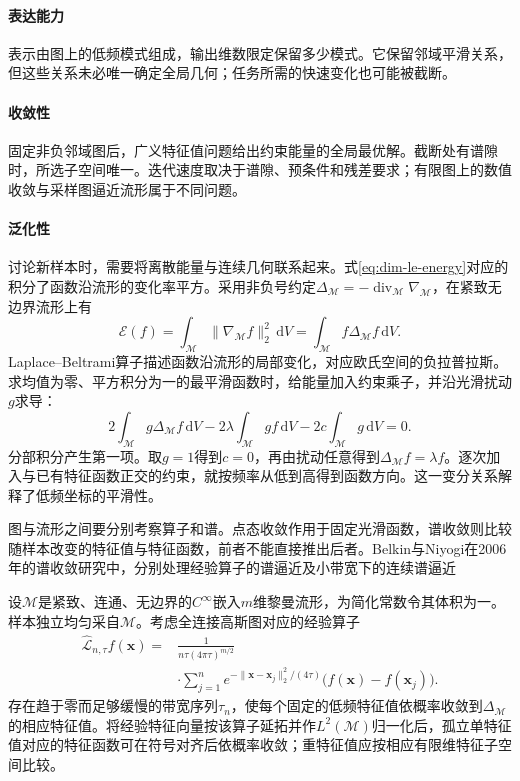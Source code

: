 \paragraph{表达能力}
表示由图上的低频模式组成，输出维数限定保留多少模式。它保留邻域平滑关系，但这些关系未必唯一确定全局几何；任务所需的快速变化也可能被截断。

\paragraph{收敛性}
固定非负邻域图后，广义特征值问题给出约束能量的全局最优解。截断处有谱隙时，所选子空间唯一。迭代速度取决于谱隙、预条件和残差要求；有限图上的数值收敛与采样图逼近流形属于不同问题。

\paragraph{泛化性}
讨论新样本时，需要将离散能量与连续几何联系起来。式\eqref{eq:dim-le-energy}对应的积分了函数沿流形的变化率平方。采用非负号约定$\Delta_{\mathcal{M}}=-\operatorname{div}_{\mathcal{M}}\nabla_{\mathcal{M}}$，在紧致无边界流形上有
\begin{equation}
  \label{eq:dim-dirichlet}
  \mathcal{E}(f)
  =\int_{\mathcal{M}}\lVert\nabla_{\mathcal{M}}f\rVert_2^2\,\mathrm{d}V
  =\int_{\mathcal{M}}f\Delta_{\mathcal{M}}f\,\mathrm{d}V.
\end{equation}
Laplace--Beltrami算子描述函数沿流形的局部变化，对应欧氏空间的负拉普拉斯。求均值为零、平方积分为一的最平滑函数时，给能量加入约束乘子，并沿光滑扰动$g$求导：
\[
  2\int_{\mathcal{M}}g\Delta_{\mathcal{M}}f\,\mathrm{d}V
  -2\lambda\int_{\mathcal{M}}gf\,\mathrm{d}V
  -2c\int_{\mathcal{M}}g\,\mathrm{d}V=0.
\]
分部积分产生第一项。取$g=1$得到$c=0$，再由扰动任意得到$\Delta_{\mathcal{M}}f=\lambda f$。逐次加入与已有特征函数正交的约束，就按频率从低到高得到函数方向。这一变分关系解释了低频坐标的平滑性。

图与流形之间要分别考察算子和谱。点态收敛作用于固定光滑函数，谱收敛则比较随样本改变的特征值与特征函数，前者不能直接推出后者。Belkin与Niyogi在2006年的谱收敛研究中，分别处理经验算子的谱逼近及小带宽下的连续谱逼近

\begin{theorem}[一种定性的谱一致性结论]
  \label{thm:dim-le-spectral}
  设$\mathcal{M}$是紧致、连通、无边界的$C^\infty$嵌入$m$维黎曼流形，为简化常数令其体积为一。样本独立均匀采自$\mathcal{M}$。考虑全连接高斯图对应的经验算子
  \[
    \begin{aligned}
      \widehat{\mathcal{L}}_{n,\tau}f(\bm{x})
      ={}&\frac{1}{n\tau(4\pi\tau)^{m/2}}\\
      &\cdot\sum_{j=1}^n
        e^{-\lVert\bm{x}-\bm{x}_j\rVert_2^2/(4\tau)}
        \bigl(f(\bm{x})-f(\bm{x}_j)\bigr).
    \end{aligned}
  \]
  存在趋于零而足够缓慢的带宽序列$\tau_n$，使每个固定的低频特征值依概率收敛到$\Delta_{\mathcal{M}}$的相应特征值。将经验特征向量按该算子延拓并作$L^2(\mathcal{M})$归一化后，孤立单特征值对应的特征函数可在符号对齐后依概率收敛；重特征值应按相应有限维特征子空间比较。
\end{theorem}

